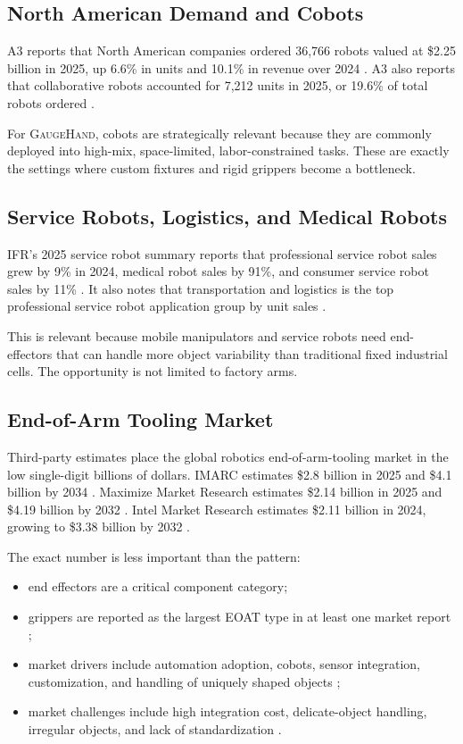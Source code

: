 \documentclass[11pt]{article}
\newcommand{\GaugeHand}{\textsc{GaugeHand}}
\begin{document}
\subsection{North American Demand and Cobots}

A3 reports that North American companies ordered 36,766 robots valued at \$2.25 billion in 2025, up 6.6\% in units and 10.1\% in revenue over 2024 \cite{a3_2025_orders}. A3 also reports that collaborative robots accounted for 7,212 units in 2025, or 19.6\% of total robots ordered \cite{a3_2025_orders}.

For \GaugeHand{}, cobots are strategically relevant because they are commonly deployed into high-mix, space-limited, labor-constrained tasks. These are exactly the settings where custom fixtures and rigid grippers become a bottleneck.

\subsection{Service Robots, Logistics, and Medical Robots}

IFR's 2025 service robot summary reports that professional service robot sales grew by 9\% in 2024, medical robot sales by 91\%, and consumer service robot sales by 11\% \cite{ifr2025service}. It also notes that transportation and logistics is the top professional service robot application group by unit sales \cite{ifr2025service}.

This is relevant because mobile manipulators and service robots need end-effectors that can handle more object variability than traditional fixed industrial cells. The opportunity is not limited to factory arms.

\subsection{End-of-Arm Tooling Market}

Third-party estimates place the global robotics end-of-arm-tooling market in the low single-digit billions of dollars. IMARC estimates \$2.8 billion in 2025 and \$4.1 billion by 2034 \cite{imarc_eoat_2026}. Maximize Market Research estimates \$2.14 billion in 2025 and \$4.19 billion by 2032 \cite{maximize_eoat_2026}. Intel Market Research estimates \$2.11 billion in 2024, growing to \$3.38 billion by 2032 \cite{intel_eoat_2025}.

The exact number is less important than the pattern:

\begin{itemize}[leftmargin=*]
  \item end effectors are a critical component category;
  \item grippers are reported as the largest EOAT type in at least one market report \cite{imarc_eoat_2026};
  \item market drivers include automation adoption, cobots, sensor integration, customization, and handling of uniquely shaped objects \cite{imarc_eoat_2026,intel_eoat_2025};
  \item market challenges include high integration cost, delicate-object handling, irregular objects, and lack of standardization \cite{intel_eoat_2025}.
\end{itemize}
\end{document}
